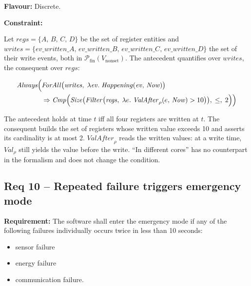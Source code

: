 \textbf{Flavour:} Discrete.

\textbf{Constraint:}

Let $\mathit{regs} = \{A,\, B,\, C,\, D\}$ be the set of register entities and $\mathit{writes} = \{\mathit{ev\_written\_A},\, \mathit{ev\_written\_B},\, \mathit{ev\_written\_C},\, \mathit{ev\_written\_D}\}$ the set of their write events, both in $\mathcal{P}_{\text{fin}}(V_{\text{nonset}})$.
The antecedent quantifies over $\mathit{writes}$, the consequent over $\mathit{regs}$:

\begin{align*}
    \mathit{Always}\Bigl(
        &\mathit{ForAll}\bigl(\mathit{writes},\;
            \lambda \mathit{ev}.\; \mathit{Happening}(\mathit{ev},\, \mathit{Now})\bigr) \\
        &\Rightarrow \mathit{Cmp}\Bigl(
            \mathit{Size}\bigl(
                \mathit{Filter}\bigl(\mathit{regs},\;
                    \lambda e.\; \mathit{ValAfter}_\rho(e,\, \mathit{Now}) > 10\bigr)
            \bigr),\; \leq,\; 2
        \Bigr)
    \Bigr)
\end{align*}

The antecedent holds at time $t$ iff all four registers are written at $t$.
The consequent builds the set of registers whose written value exceeds 10 and asserts its cardinality is at most 2.
$\mathit{ValAfter}_\rho$ reads the written values: at a write time, $\mathit{Val}_\rho$ still yields the value before the write.
``In different cores'' has no counterpart in the formalism and does not change the condition.

\subsection{Req 10 -- Repeated failure triggers emergency mode}

\textbf{Requirement:} The software shall enter the emergency mode if any of the following failures individually occurs twice in less than 10 seconds:
\begin{itemize}
    \item[(a)] sensor failure
    \item[(b)] energy failure
    \item[(c)] communication failure.
\end{itemize}

